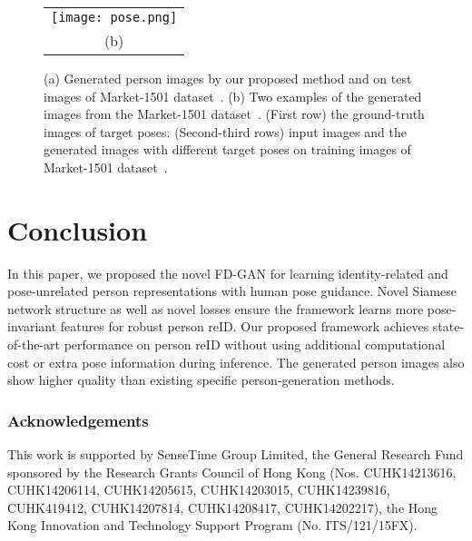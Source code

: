 \documentclass{article}
\begin{document}
\begin{figure}[tb]
	\begin{tabular}{@{}c@{}}
	\texttt{[image: pose.png]} \\
	\small (b)
	\end{tabular}
	
	\caption{(a) Generated person images by our proposed method and \citep{ma2017pose, siarohin2017deformable} on test images of Market-1501 dataset~\cite{market}. 
	(b) Two examples of the generated images from the Market-1501 dataset~\cite{market}. (First row) the ground-truth images of target poses. 
(Second-third rows) input images and the generated images with different target poses on training images of Market-1501 dataset~\cite{market}.	}
	\label{fig:compare}
\end{figure}

\section{Conclusion}
In this paper, we proposed the novel FD-GAN for learning identity-related and pose-unrelated person representations with human pose guidance. Novel Siamese network structure as well as novel losses ensure the framework learns more pose-invariant features for robust person reID.
Our proposed framework achieves state-of-the-art performance on person reID without using additional computational cost or extra pose information during inference. 
The generated person images also show higher quality than existing specific person-generation methods.

\subsubsection*{Acknowledgements}
This work is supported by SenseTime Group Limited, the General Research Fund sponsored by the Research Grants  Council of Hong Kong (Nos. CUHK14213616, CUHK14206114, CUHK14205615, CUHK14203015, CUHK14239816, CUHK419412, CUHK14207814, CUHK14208417, CUHK14202217), the Hong Kong Innovation and Technology Support Program (No. ITS/121/15FX).




\end{document}
